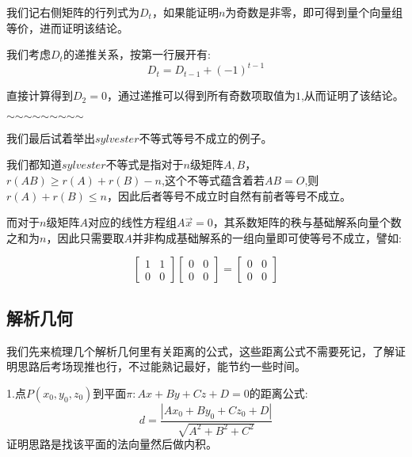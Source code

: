 \documentclass[a4paper,12pt]{ctexart}
\begin{document}
我们记右侧矩阵的行列式为$D_t$，如果能证明$n$为奇数是非零，即可得到量个向量组等价，进而证明该结论。

我们考虑$D_t$的递推关系，按第一行展开有:
\begin{equation*}
    D_t=D_{t-1}+(-1)^{t-1}
\end{equation*}

直接计算得到$D_2=0$，通过递推可以得到所有奇数项取值为$1$,从而证明了该结论。

\noindent\hfil$\sim$\hfil$\sim$\hfil$\sim$\hfil$\sim$\hfil$\sim$\hfil$\sim$\hfil$\sim$\hfil$\sim$\hfil$\sim$\hfil

我们最后试着举出$sylvester$不等式等号不成立的例子。

我们都知道$sylvester$不等式是指对于$n$级矩阵$A,B$，$r(AB)\ge r(A)+r(B)-n$,这个不等式蕴含着若$AB=O$,则$r(A)+r(B)\le n$，因此后者等号不成立时自然有前者等号不成立。

而对于$n$级矩阵$A$对应的线性方程组$A\vec{x}=0$，其系数矩阵的秩与基础解系向量个数之和为$n$，因此只需要取$A$并非构成基础解系的一组向量即可使等号不成立，譬如:

\begin{equation*}
    \begin{bmatrix}
        1 & 1 \\
        0 & 0
    \end{bmatrix}\begin{bmatrix}
        0 & 0 \\
        0 & 0
    \end{bmatrix}=\begin{bmatrix}
        0 & 0 \\
        0 & 0
    \end{bmatrix}
\end{equation*}
\subsection{解析几何}
我们先来梳理几个解析几何里有关距离的公式，这些距离公式不需要死记，了解证明思路后考场现推也行，不过能熟记最好，能节约一些时间。

1.点$P(x_0,y_0,z_0)$到平面$\pi :Ax+By+Cz+D=0$的距离公式:
\begin{equation*}
    d=\frac{|Ax_0+By_0+Cz_0+D|}{\sqrt{A^2+B^2+C^2}}
\end{equation*}
证明思路是找该平面的法向量然后做内积。
\end{document}

